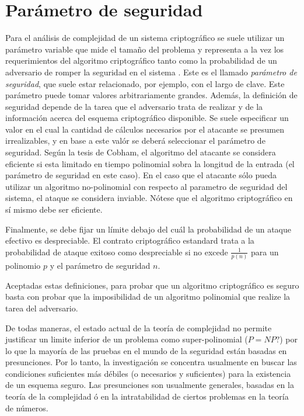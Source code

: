 \section{Parámetro de seguridad}

Para el análisis de complejidad de un sistema criptográfico se suele utilizar un parámetro variable que mide el tamaño del problema y representa a la vez los requerimientos del algoritmo criptográfico tanto como la probabilidad de un adversario de romper la seguridad en el sistema \cite{iashchenko2002cryptography}. Este es el llamado \textit{parámetro de seguridad}, que suele estar relacionado, por ejemplo, con el largo de clave.
Este parámetro puede tomar valores arbitrariamente grandes.
Además, la definición de seguridad depende de la tarea que el adversario trata de realizar y de la información acerca del esquema criptográfico disponible.
Se suele especificar un valor en el cual la cantidad de cálculos necesarios por el atacante se presumen irrealizables, y en base a este valór se deberá seleccionar el parámetro de seguridad.
Según la tesis de Cobham\cite{citeulike:6647003}, el algoritmo del atacante se considera eficiente si esta limitado en tiempo polinomial sobra la longitud de la entrada (el parámetro de seguridad en este caso). En el caso que el atacante sólo pueda utilizar un algoritmo no-polinomial con respecto al parametro de seguridad del sistema, el ataque se considera inviable. Nótese que el algoritmo criptográfico en sí mismo debe ser eficiente.

Finalmente, se debe fijar un límite debajo del cuál la probabilidad de un ataque efectivo es despreciable. El contrato criptográfico estandard trata a la probabilidad de ataque exitoso como despreciable si no excede $\frac{1}{p(n)}$  para un polinomio $p$ y el parámetro de seguridad $n$\cite{iashchenko2002cryptography}.

Aceptadas estas definiciones, para probar que un algoritmo criptográfico es seguro basta con probar que la imposibilidad de un algoritmo polinomial que realize la tarea del adversario.

De todas maneras, el estado actual de la teoría de complejidad no permite justificar un limite inferior de un problema como super-polinomial ($P=NP?$) por lo que la mayoría de las pruebas en el mundo de la seguridad están basadas en presunciones.
Por lo tanto, la investigación se concentra usualmente en buscar las condiciones suficientes más débiles (o necesarios y suficientes) para la existencia de un esquema seguro.
Las presunciones son usualmente generales, basadas en la teoría de la complejidad ó en la intratabilidad de ciertos problemas en la teoría de números.

